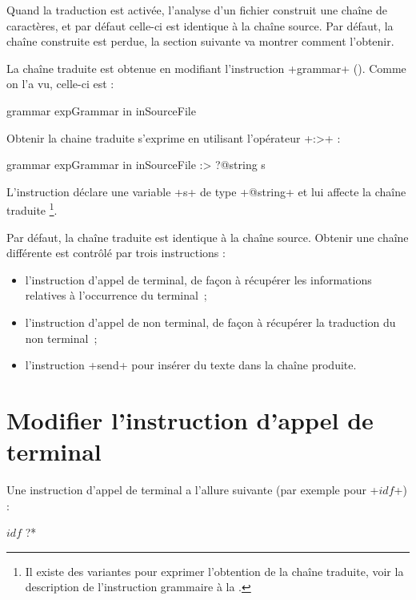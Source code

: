 Quand la traduction est activée, l'analyse d'un fichier construit une chaîne de caractères, et par défaut celle-ci est identique à la chaîne source. Par défaut, la chaîne construite est perdue, la section suivante va montrer comment l'obtenir.









La chaîne traduite est obtenue en modifiant l'instruction \ggst+grammar+ (). Comme on l'a vu, celle-ci est :
\begin{galgas3}
grammar expGrammar in inSourceFile
\end{galgas3}

Obtenir la chaine traduite s'exprime en utilisant l'opérateur  \ggst+:>+ :
\begin{galgas3}
grammar expGrammar in inSourceFile :> ?@string s
\end{galgas3}

L'instruction déclare une variable \ggst+s+ de type \ggst+@string+ et lui affecte la chaîne traduite \footnote{Il existe des variantes pour exprimer l'obtention de la chaîne traduite, voir la description de l'instruction grammaire à la .}.

Par défaut, la chaîne traduite est identique à la chaîne source. Obtenir une chaîne différente est contrôlé par trois instructions :
\begin{itemize}
  \item l'instruction d'appel de terminal, de façon à récupérer les informations relatives à l'occurrence du terminal~;
  \item l'instruction d'appel de non terminal, de façon à récupérer la traduction du non terminal~;
  \item l'instruction \ggst+send+ pour insérer du texte dans la chaîne produite.
\end{itemize}







\section{Modifier l'instruction d'appel de terminal}

Une instruction d'appel de terminal a l'allure suivante (par exemple pour \ggst+$idf$+) :
\begin{galgas3}
$idf$ ?*
\end{galgas3}

